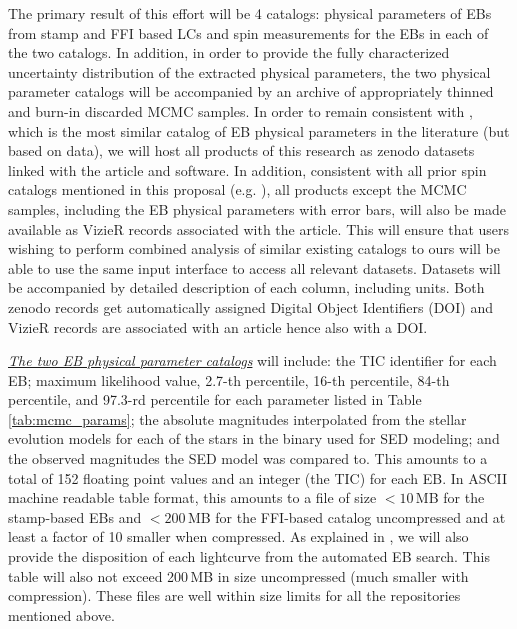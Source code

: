 The primary result of this effort will be 4 catalogs: physical parameters of EBs
from stamp and FFI based LCs and spin measurements for the EBs in each of the
two catalogs. In addition, in order to provide the fully characterized
uncertainty distribution of the extracted physical parameters, the two physical
parameter catalogs will be accompanied by an archive of appropriately thinned
and burn-in discarded MCMC samples. In order to remain consistent with
\citep{Windemuth_et_al_19}, which is the most similar catalog of EB physical
parameters in the literature (but based on \kepler{} data), we will host all
products of this research as zenodo \citep{zenodo} datasets linked with the
article and software. In addition, consistent with all prior spin catalogs
mentioned in this proposal (e.g.  \citep{Lurie_et_al_17, Oelkers_et_al_18,
CantoMartins_et_al_20}), all products except the MCMC samples, including the EB
physical parameters with error bars, will also be made available as VizieR
\citep{vizier} records associated with the article. This will ensure that users
wishing to perform combined analysis of similar existing catalogs to ours will
be able to use the same input interface to access all relevant datasets.
Datasets will be accompanied by detailed description of each column, including
units. Both zenodo records get automatically assigned Digital Object Identifiers
(DOI) and VizieR records are associated with an article hence also with a DOI.

\textit{\underline{The two EB physical parameter catalogs}} will include: the
TIC identifier for each EB; maximum likelihood value, 2.7-th percentile, 16-th
percentile, 84-th percentile, and 97.3-rd percentile for each parameter listed
in Table \ref{tab:mcmc_params}; the absolute magnitudes interpolated from the
stellar evolution models for each of the stars in the binary used for SED
modeling; and the observed magnitudes the SED model was compared to. This
amounts to a total of 152 floating point values and an integer (the TIC) for
each EB. In ASCII machine readable table format, this amounts to a file of size
$<10$\,MB for the stamp-based EBs and $<200$\,MB for the FFI-based catalog
uncompressed and at least a factor of 10 smaller when compressed. As explained
in , we will also provide the disposition of each
lightcurve from the automated EB search. This table will also not exceed 200\,MB
in size uncompressed (much smaller with compression). These files are well
within size limits for all the repositories mentioned above.


